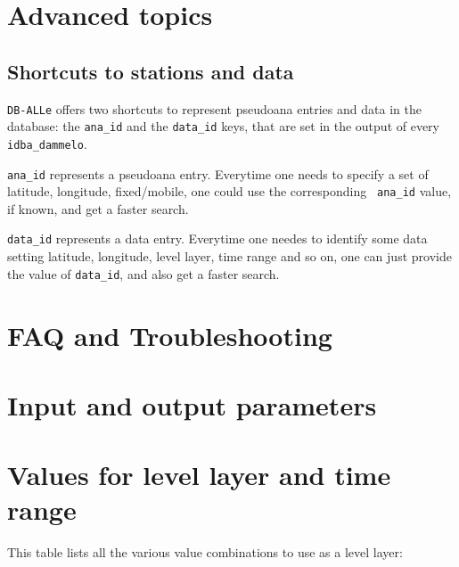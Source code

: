 \documentclass[draft,12pt,a4paper,twoside]{book}
\newcommand{\dballe}{{\tt DB-ALLe}}
\begin{document}
\chapter{Advanced topics}

\section{Shortcuts to stations and data}

\dballe{} offers two shortcuts to represent pseudoana entries and data in the
database: the {\tt ana\_id} and the {\tt data\_id} keys, that are set in the
output of every {\tt idba\_dammelo}.

{\tt ana\_id} represents a pseudoana entry.  Everytime one needs to specify a
set of latitude, longitude, fixed/mobile, one could use the corresponding {\tt
ana\_id} value, if known, and get a faster search.

{\tt data\_id} represents a data entry.  Everytime one needes to identify some
data setting latitude, longitude, level layer, time range and so on, one can
just provide the value of {\tt data\_id}, and also get a faster search.



\chapter{FAQ and Troubleshooting}
\label{ch-trouble}

\appendix

\chapter{Input and output parameters}

\label{parmtable}



\chapter{Values for level layer and time range}

This table lists all the various value combinations to use as a level layer:
\end{document}
